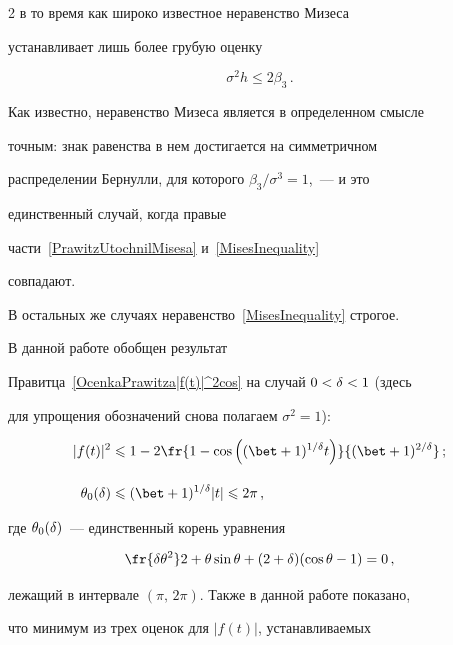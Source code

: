 \begin{multicols}{2}
в то время как широко известное неравенство Мизеса~\cite{Mises1939}

устанавливает лишь более грубую оценку

\begin{equation}

\label{MisesInequality}

\sigma^2h\le 2\beta_3\,.

\end{equation}

Как известно, неравенство Мизеса является в определенном смысле

точным: знак равенства в нем достигается на симметричном

распределении Бернулли, для которого $\beta_3/\sigma^3=1$,~--- и это

единственный случай, когда правые

части~\eqref{PrawitzUtochnilMisesa} и~\eqref{MisesInequality}

совпадают.

В остальных же случаях неравенство~\eqref{MisesInequality} строгое.



В данной работе обобщен результат

Правитца~\eqref{OcenkaPrawitza|f(t)|^2cos} на случай $0<\delta<1$ (здесь

для упрощения обозначений снова полагаем $\sigma^2=1$):

\begin{align}

|f(t)|^2 & \le1- 2 \fr{1-\cos\left((\bet+1)^{1/\d} t\right)}

 {(\bet+1)^{2/\d}}\,;\notag\\[-6pt]

 &\label{OcenkaShevtsovoi|f(t)|^2cos}\\

\theta_0(\d) & \le (\bet+1)^{1/\d}|t|  \le2\pi\,,\notag

\end{align}

где $\theta_0(\delta)$~--- единственный корень уравнения

$$

\fr{\d\theta^2}2+ \theta\sin \theta + (2+\d)(\cos \theta - 1)=0\,,

$$

лежащий в интервале $(\pi,\,2\pi)$. Также в данной работе показано,

что минимум из трех оценок для $|f(t)|$, устанавливаемых


\end{multicols}
